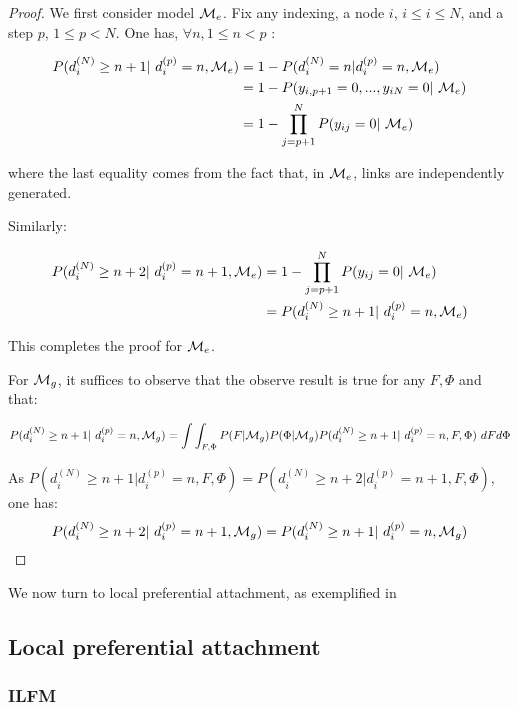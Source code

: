 \begin{proof}
We first consider model $\mathcal{M}_e$. Fix any indexing, a node $i$, $i \leq i \leq N$, and a step $p$, $1 \leq p < N$. One has, $\forall n, 1 \leq n < p$ :

\begin{align*}
P(d_i^{(N)} \geq n+1 | d_i^{(p)}=n, \M_e) &= 1 - P(d_i^{(N)}=n | d_i^{(p)}=n, \M_e) \\
        &= 1 -P(y_{i,p+1}=0, ...,y_{iN}=0 | \M_e ) \\
        &= 1 - \prod_{j=p+1}^N P(y_{ij}=0 | \M_e)
\end{align*}

where the last equality comes from the fact that, in $\mathcal{M}_e$, links are independently generated.

Similarly:

\begin{align*}
P(d_i^{(N)} \geq n+2 | d_i^{(p)}=n+1, \M_e) &= 1 - \prod_{j=p+1}^N P(y_{ij}=0 | \M_e) \\
                    &=P(d_i^{(N)} \geq n+1 | d_i^{(p)}=n, \M_e)
\end{align*}

This completes the proof for $\mathcal{M}_e$.

For $\mathcal{M}_g$, it suffices to observe that the observe result is true for any $F, \Phi$ and that:

\begin{equation*}
P(d_i^{(N)} \geq n+1 | d_i^{(p)}=n, \M_g)  = \int\int_{F,\Phi} P(F|\M_g)P(\Phi|\M_g) P(d_i^{(N)} \geq n+1 | d_i^{(p)}=n, F, \Phi) \ dF d\Phi
\end{equation*}

As $P(d_i^{(N)} \geq n+1 | d_i^{(p)}=n, F, \Phi) = P(d_i^{(N)} \geq n+2 | d_i^{(p)}=n+1, F, \Phi)$, one has:
\begin{equation*}
P(d_i^{(N)} \geq n+2 | d_i^{(p)}=n+1, \M_g) = P(d_i^{(N)} \geq n+1 | d_i^{(p)}=n, \M_g)
\end{equation*}

\end{proof}


We now turn to local preferential attachment, as exemplified in \cite{LeskovecBKT08}


\subsection{Local preferential attachment}
\label{sec:local_me}

\subsubsection{ILFM}

